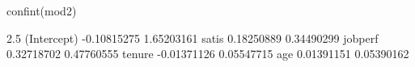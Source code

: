 \begin{Schunk}
\begin{Sinput}
 confint(mod2)
\end{Sinput}
\begin{Soutput}
                  2.5 %     97.5 %
(Intercept) -0.10815275 1.65203161
satis        0.18250889 0.34490299
jobperf      0.32718702 0.47760555
tenure      -0.01371126 0.05547715
age          0.01391151 0.05390162
\end{Soutput}
\end{Schunk}
